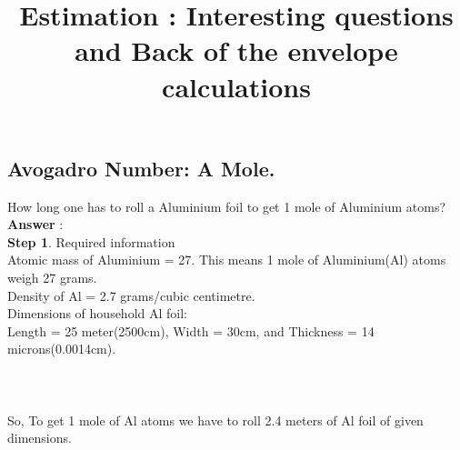 \documentclass[11pt]{exam}
\begin{document}
\title{\textbf{Estimation : Interesting questions and Back of the envelope calculations}}
\maketitle
\subsection{Avogadro Number: A Mole.}
\begin{questions}

\question
\label{Q:Al Foil}
How long one has to roll a Aluminium foil to get 1 mole of Aluminium atoms?\\
\textbf{Answer }: 
\\ 
\textbf{Step 1}. Required information\\ 
                  Atomic mass of Aluminium = 27. This means 1 mole of    Aluminium(Al) atoms weigh 27 grams.\\
                  Density of Al = 2.7 grams/cubic centimetre.\\
                  Dimensions of household Al foil:\\ Length = 25        meter(2500cm), Width = 30cm, and Thickness = 14 microns(0.0014cm).\\ \\
 \\ \\                
        So, To get 1 mole of Al atoms we have to roll 2.4 meters of Al foil of given dimensions.


\end{questions}
\end{document}
